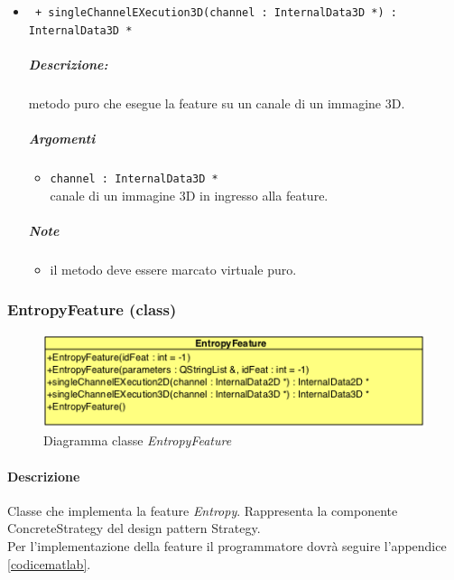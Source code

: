 \begin{itemize}
	\item \color{blue}\verb! + singleChannelEXecution3D(channel : InternalData3D *) : InternalData3D *!
		\color{black}
		\subparagraph{Descrizione:} metodo puro che esegue la feature su un canale di un immagine 3D.
		\subparagraph{Argomenti}
			\begin{itemize}
				\item \color{RoyalPurple} \verb!channel : InternalData3D * ! \\ 
				\color{black} canale di un immagine 3D in ingresso alla feature.		
			\end{itemize}
		\subparagraph{Note}
			\begin{itemize}
				\item il metodo deve essere marcato virtuale puro.
			\end{itemize}
			
	\end{itemize}
	
\color{black}
\pagebreak
\subsubsection{EntropyFeature (class)}
\label{EntropyFeature}
\begin{figure}[!h]
\centering
			\includegraphics[scale=1]{./Content/Immagini/modelCore/EntropyFeature.png}
			\caption{Diagramma classe \textsl{EntropyFeature}}
			\label{EntropyFeature_img}
\end{figure}

\paragraph{Descrizione \\} Classe che implementa la feature\g{} \textit{Entropy}. Rappresenta la componente ConcreteStrategy del design pattern\g{} Strategy.
\\Per l'implementazione della feature\g{} il programmatore dovrà seguire l'appendice \ref{codicematlab}.

